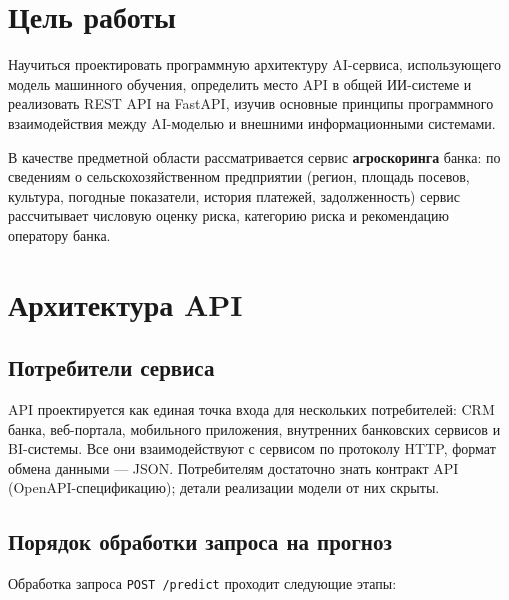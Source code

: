 \documentclass[12pt,a4paper]{article}
\begin{document}
\tableofcontents
\newpage

\section{Цель работы}

Научиться проектировать программную архитектуру AI-сервиса, использующего модель машинного обучения, определить место API в общей ИИ-системе и реализовать REST API на FastAPI, изучив основные принципы программного взаимодействия между AI-моделью и внешними информационными системами.

В качестве предметной области рассматривается сервис \textbf{агроскоринга} банка: по сведениям о сельскохозяйственном предприятии (регион, площадь посевов, культура, погодные показатели, история платежей, задолженность) сервис рассчитывает числовую оценку риска, категорию риска и рекомендацию оператору банка.

\section{Архитектура API}

\subsection{Потребители сервиса}

API проектируется как единая точка входа для нескольких потребителей: CRM банка, веб-портала, мобильного приложения, внутренних банковских сервисов и BI-системы. Все они взаимодействуют с сервисом по протоколу HTTP, формат обмена данными --- JSON. Потребителям достаточно знать контракт API (OpenAPI-спецификацию); детали реализации модели от них скрыты.

\subsection{Порядок обработки запроса на прогноз}

Обработка запроса \texttt{POST /predict} проходит следующие этапы:
\end{document}
